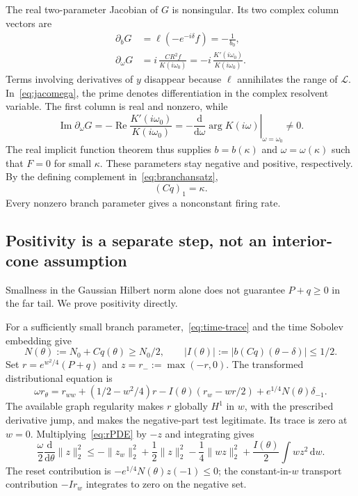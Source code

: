 \documentclass[11pt,a4paper]{article}
\numberwithin{equation}{section}
\theoremstyle{remark}\newtheorem{remark}[theorem]{Remark}
\newcommand{\dd}{\,\mathrm d}
\DeclareMathOperator{\Rea}{Re}
\DeclareMathOperator{\Ima}{Im}
\begin{document}
The real two-parameter Jacobian of $G$ is nonsingular. Its two complex column vectors are
\begin{align}
 \partial_bG&=\ell(-e^{-i\delta}f)=-\frac1{b_0},\label{eq:jacb}\\
 \partial_\omega G&=i\,\frac{CR^2f}{K(i\omega_0)}
          =-i\,\frac{K'(i\omega_0)}{K(i\omega_0)}.\label{eq:jacomega}
\end{align}
Terms involving derivatives of $y$ disappear because $\ell$ annihilates the range of $\mathcal L$. In~\eqref{eq:jacomega}, the prime denotes differentiation in the complex resolvent variable. The first column is real and nonzero, while
\[
 \Ima\partial_\omega G
 =-\Rea\frac{K'(i\omega_0)}{K(i\omega_0)}
 =-\left.\frac{\mathrm d}{\mathrm d\omega}\arg K(i\omega)
   \right|_{\omega=\omega_0}\ne0.
\]
The real implicit function theorem thus supplies $b=b(\kappa)$ and $\omega=\omega(\kappa)$ such that $F=0$ for small $\kappa$. These parameters stay negative and positive, respectively. By the defining complement in~\eqref{eq:branchansatz},
\begin{equation}\label{eq:nonconstant}
 (Cq)_1=\kappa.
\end{equation}
Every nonzero branch parameter gives a nonconstant firing rate.

\subsection{Positivity is a separate step, not an interior-cone assumption}
Smallness in the Gaussian Hilbert norm alone does not guarantee $P+q\geq0$ in the far tail. We prove positivity directly.

For a sufficiently small branch parameter,~\eqref{eq:time-trace} and the time Sobolev embedding give
\begin{equation}\label{eq:smallinput}
 N(\theta):=N_0+Cq(\theta)\geq N_0/2,
 \qquad |I(\theta)|:=|b(Cq)(\theta-\delta)|\leq1/2.
\end{equation}
Set $r=e^{w^2/4}(P+q)$ and $z=r_-:=\max(-r,0)$. The transformed distributional equation is
\begin{equation}\label{eq:rPDE}
 \omega r_\theta=r_{ww}+(1/2-w^2/4)r
 -I(\theta)(r_w-wr/2)+e^{1/4}N(\theta)\delta_{-1}.
\end{equation}
The available graph regularity makes $r$ globally $H^1$ in $w$, with the prescribed derivative jump, and makes the negative-part test legitimate. Its trace is zero at $w=0$. Multiplying~\eqref{eq:rPDE} by $-z$ and integrating gives
\begin{equation}\label{eq:negativeenergy}
 \frac\omega2\frac{\mathrm d}{\mathrm d\theta}\|z\|_2^2
 \leq-\|z_w\|_2^2+\frac12\|z\|_2^2
       -\frac14\|wz\|_2^2+
       \frac{I(\theta)}2\int w z^2\dd w.
\end{equation}
The reset contribution is $-e^{1/4}N(\theta)z(-1)\leq0$; the constant-in-$w$ transport contribution $-I r_w$ integrates to zero on the negative set.
\end{document}
